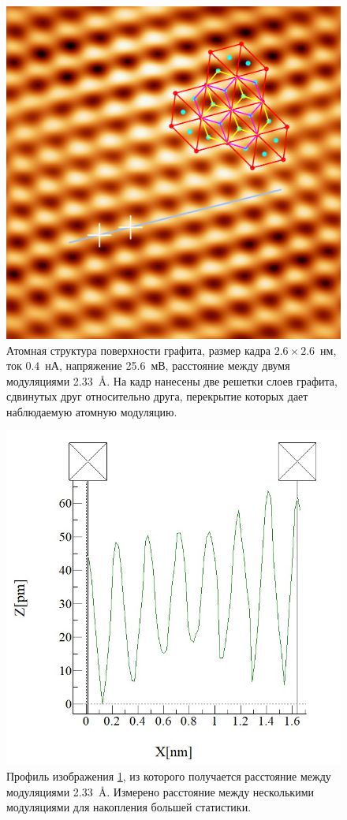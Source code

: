 \documentclass[a4paper, 12pt]{article}
\begin{document}
	\begin{figure}[H]
		\centering
		\includegraphics[width=0.6\linewidth]{../STM_data/Crystal_cell_structure/Crystal_structure_with_net}
		\caption{Атомная структура поверхности графита, размер кадра $2.6\times2.6$~нм, ток $0.4$~нА, напряжение 25.6~мВ, расстояние между двумя модуляциями 2.33~\AA. На кадр нанесены две решетки слоев графита, сдвинутых друг относительно друга, перекрытие которых дает наблюдаемую атомную модуляцию.}
		\label{fig:2_atomic}
	\end{figure}

	\begin{figure}[H]
		\centering
		\includegraphics[width=0.5\linewidth]{../STM_data/Crystal_cell_structure/Crystal_structure_g}
		\caption{Профиль изображения \ref{fig:2_atomic}, из которого получается расстояние между модуляциями 2.33~\AA. Измерено расстояние между несколькими модуляциями для накопления большей статистики.}
		\label{fig:2_atomic_g}
	\end{figure}
	
\end{document}
